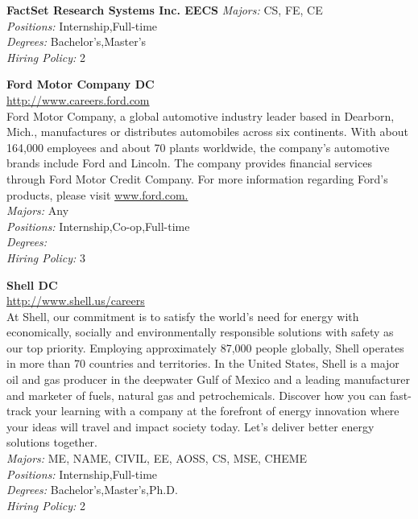 \documentclass[twoside]{article}
\begin{document}
\begin{center}
\begin{multicols}{2}
\begin{minipage}{.95\columnwidth}{\Large\bf FactSet Research Systems Inc. \hfill EECS}
    \emph{Majors:} CS, FE, CE\\
    \emph{Positions:} Internship,Full-time\\
    \emph{Degrees:} Bachelor's,Master's\\
    \emph{Hiring Policy:} 2\\
\end{minipage}
 \begin{minipage}{.95\columnwidth}{\Large\bf Ford Motor Company \hfill DC}\\
    \url{http://www.careers.ford.com}\\
    Ford Motor Company, a global automotive industry leader based in Dearborn, Mich., manufactures or distributes automobiles across six continents. With about 164,000 employees and about 70 plants worldwide, the company's automotive brands include Ford and Lincoln. The company provides financial services through Ford Motor Credit Company. For more information regarding Ford's products, please visit \url{www.ford.com.}\\
    \emph{Majors:} Any\\
    \emph{Positions:} Internship,Co-op,Full-time\\
    \emph{Degrees:} \\
    \emph{Hiring Policy:} 3\\
\end{minipage}
 \begin{minipage}{.95\columnwidth}{\Large\bf Shell \hfill DC}\\
    \url{http://www.shell.us/careers}\\
    At Shell, our commitment is to satisfy the world’s need for energy with economically, socially and environmentally responsible solutions with safety as our top priority. Employing approximately 87,000 people globally, Shell operates in more than 70 countries and territories. In the United States, Shell is a major oil and gas producer in the deepwater Gulf of Mexico and a leading manufacturer and marketer of fuels, natural gas and petrochemicals. Discover how you can fast-track your learning with a company at the forefront of energy innovation where your ideas will travel and impact society today. Let’s deliver better energy solutions together.\\
    \emph{Majors:} ME, NAME, CIVIL, EE, AOSS, CS, MSE, CHEME\\
    \emph{Positions:} Internship,Full-time\\
    \emph{Degrees:} Bachelor's,Master's,Ph.D.\\
    \emph{Hiring Policy:} 2\\
\end{minipage}
 \end{multicols}\end{center}
\end{document}
